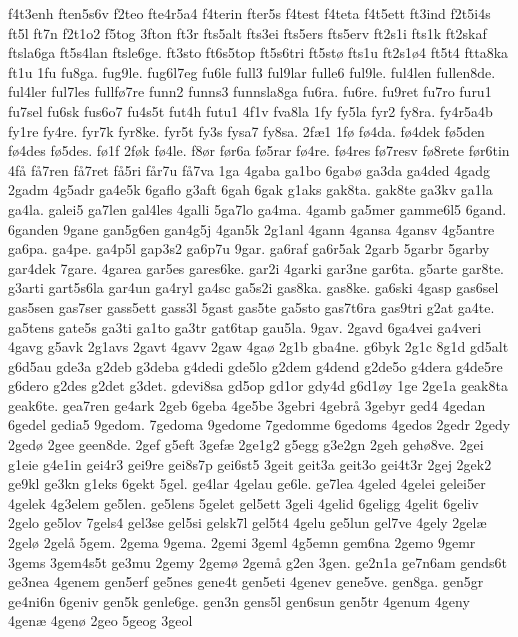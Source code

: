 f4t3enh
ften5s6v
f2teo
fte4r5a4
f4terin
fter5s
f4test
f4teta
f4t5ett
ft3ind
f2t5i4s
ft5l
ft7n
f2t1o2
f5tog
3fton
ft3r
fts5alt
fts3ei
fts5ers
fts5erv
ft2s1i
fts1k
ft2skaf
ftsla6ga
ft5s4lan
ftsle6ge.
ft3sto
ft6s5top
ft5s6tri
ft5st^^f8
fts1u
ft2s1^^f84
ft5t4
ftta8ka
ft1u
1fu
fu8ga.
fug9le.
fug6l7eg
fu6le
full3
ful9lar
fulle6
ful9le.
ful4len
fullen8de.
ful4ler
ful7les
fullf^^f87re
funn2
funns3
funnsla8ga
fu6ra.
fu6re.
fu9ret
fu7ro
furu1
fu7sel
fu6sk
fus6o7
fu4s5t
fut4h
futu1
4f1v
fva8la
1fy
fy5la
fyr2
fy8ra.
fy4r5a4b
fy1re
fy4re.
fyr7k
fyr8ke.
fyr5t
fy3s
fysa7
fy8sa.
2f^^e61
1f^^f8
f^^f84da.
f^^f84dek
f^^f85den
f^^f84des
f^^f85des.
f^^f81f
2f^^f8k
f^^f84le.
f8^^f8r
f^^f8r6a
f^^f85rar
f^^f84re.
f^^f84res
f^^f87resv
f^^f88rete
f^^f8r6tin
4f^^e5
f^^e57ren
f^^e57ret
f^^e55ri
f^^e5r7u
f^^e57va
1ga
4gaba
ga1bo
6gab^^f8
ga3da
ga4ded
4gadg
2gadm
4g5adr
ga4e5k
6gaflo
g3aft
6gah
6gak
g1aks
gak8ta.
gak8te
ga3kv
ga1la
ga4la.
galei5
ga7len
gal4les
4galli
5ga7lo
ga4ma.
4gamb
ga5mer
gamme6l5
6gand.
6ganden
9gane
gan5g6en
gan4g5j
4gan5k
2g1anl
4gann
4gansa
4gansv
4g5antre
ga6pa.
ga4pe.
ga4p5l
gap3s2
ga6p7u
9gar.
ga6raf
ga6r5ak
2garb
5garbr
5garby
gar4dek
7gare.
4garea
gar5es
gares6ke.
gar2i
4garki
gar3ne
gar6ta.
g5arte
gar8te.
g3arti
gart5s6la
gar4un
ga4ryl
ga4sc
ga5s2i
gas8ka.
gas8ke.
ga6ski
4gasp
gas6sel
gas5sen
gas7ser
gass5ett
gass3l
5gast
gas5te
ga5sto
gas7t6ra
gas9tri
g2at
ga4te.
ga5tens
gate5s
ga3ti
ga1to
ga3tr
gat6tap
gau5la.
9gav.
2gavd
6ga4vei
ga4veri
4gavg
g5avk
2g1avs
2gavt
4gavv
2gaw
4ga^^f8
2g1b
gba4ne.
g6byk
2g1c
8g1d
gd5alt
g6d5au
gde3a
g2deb
g3deba
g4dedi
gde5lo
g2dem
g4dend
g2de5o
g4dera
g4de5re
g6dero
g2des
g2det
g3det.
gdevi8sa
gd5op
gd1or
gdy4d
g6d1^^f8y
1ge
2ge1a
geak8ta
geak6te.
gea7ren
ge4ark
2geb
6geba
4ge5be
3gebri
4gebr^^e5
3gebyr
ged4
4gedan
6gedel
gedia5
9gedom.
7gedoma
9gedome
7gedomme
6gedoms
4gedos
2gedr
2gedy
2ged^^f8
2gee
geen8de.
2gef
g5eft
3gef^^e6
2ge1g2
g5egg
g3e2gn
2geh
geh^^f88ve.
2gei
g1eie
g4e1in
gei4r3
gei9re
gei8s7p
gei6st5
3geit
geit3a
geit3o
gei4t3r
2gej
2gek2
ge9kl
ge3kn
g1eks
6gekt
5gel.
ge4lar
4gelau
ge6le.
ge7lea
4geled
4gelei
gelei5er
4gelek
4g3elem
ge5len.
ge5lens
5gelet
gel5ett
3geli
4gelid
6geligg
4gelit
6geliv
2gelo
ge5lov
7gels4
gel3se
gel5si
gelsk7l
gel5t4
4gelu
ge5lun
gel7ve
4gely
2gel^^e6
2gel^^f8
2gel^^e5
5gem.
2gema
9gema.
2gemi
3geml
4g5emn
gem6na
2gemo
9gemr
3gems
3gem4s5t
ge3mu
2gemy
2gem^^f8
2gem^^e5
g2en
3gen.
ge2n1a
ge7n6am
gends6t
ge3nea
4genem
gen5erf
ge5nes
gene4t
gen5eti
4genev
gene5ve.
gen8ga.
gen5gr
ge4ni6n
6geniv
gen5k
genle6ge.
gen3n
gens5l
gen6sun
gen5tr
4genum
4geny
4gen^^e6
4gen^^f8
2geo
5geog
3geol
